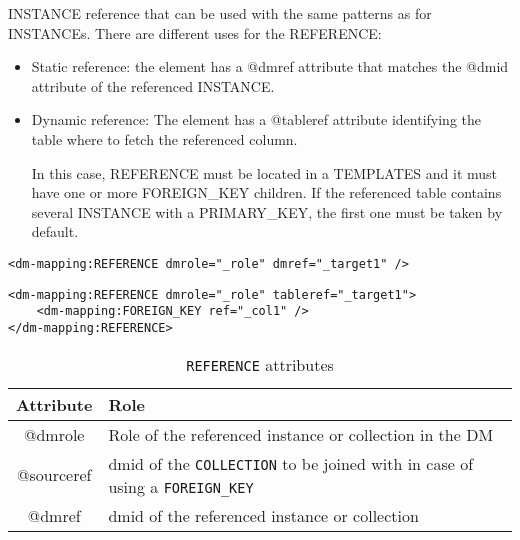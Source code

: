 INSTANCE reference that can be used with the same patterns as for INSTANCEs.
There are different uses for the REFERENCE:

\begin{itemize}
    \item Static reference: the element has a @dmref attribute that matches the @dmid attribute of the referenced INSTANCE.
    \item Dynamic reference: The element has a @tableref attribute identifying  the table where to fetch the referenced column. 
    
             In this case, REFERENCE must be located in a TEMPLATES and it must have one or more FOREIGN\_KEY children. 
             If the referenced table contains several INSTANCE with a PRIMARY\_KEY, the first one must be taken by default.
\end{itemize}

\begin{lstlisting}[frame=single,caption={Simple \texttt{REFERENCE}, to be replaced with the INSTANCE having @dmid=\_target1 },style=XML,basicstyle=\tiny]
<dm-mapping:REFERENCE dmrole="_role" dmref="_target1" />
\end{lstlisting}

\begin{lstlisting}[frame=single,caption={Dynamic \texttt{REFERENCE}, to be replaced with the INSTANCE of the table of collection \_target1 and having a PRIMARY\_KEY matching the value of column  \_col1. This pattern is valid in the context of a TEMPLATES},style=XML,basicstyle=\tiny]
<dm-mapping:REFERENCE dmrole="_role" tableref="_target1">
    <dm-mapping:FOREIGN_KEY ref="_col1" />
</dm-mapping:REFERENCE>
\end{lstlisting}

\begin{table}[!htbp]
\small
\centering
\begin{tabulary}{\linewidth}{|c|J|}       
       \hline 
            \textbf{Attribute} & 
            \textbf {Role}\\
       \hline         \hline  
            @dmrole & 
            Role of the referenced instance or collection in the DM \\
        \hline 
            @sourceref& 
            dmid of the \texttt{COLLECTION} to be joined with in case of using a \texttt{FOREIGN\_KEY} \\
        \hline 
            @dmref & 
            dmid of the referenced instance or collection\\
        \hline 
     \end{tabulary}
     \caption{\texttt{REFERENCE} attributes} 
     \label{tbl:reference-att}
 \end{table}

